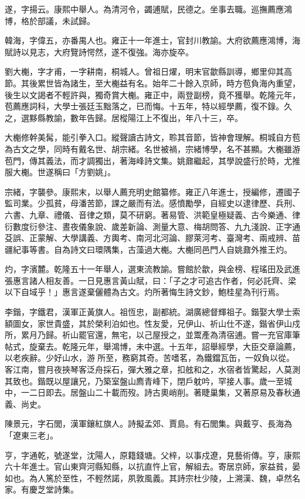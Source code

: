 \begin{pinyinscope}
遂，字揚云。康熙中舉人。為清河令，蠲逋賦，民德之。坐事去職。巡撫薦應鴻博，格於部議，未試歸。

韓海，字偉五，亦番禺人也。雍正十一年進士，官封川教諭。大府欲薦應鴻博，海賦詩以見志，大府覽詩愕然，遂不復強。海亦旋卒。

劉大櫆，字才甫，一字耕南，桐城人。曾祖日燿，明末官歙縣訓導，鄉里仰其高節。其後累世皆為諸生，至大櫆益有名。始年二十餘入京師，時方苞負海內重望，後生以文謁者不輕許與，獨奇賞大櫆。雍正中，兩登副榜，竟不獲舉。乾隆元年，苞薦應詞科，大學士張廷玉黜落之，已而悔。十五年，特以經學薦，復不錄。久之，選黟縣教諭，數年告歸。居樅陽江上不復出，年八十三，卒。

大櫆修幹美髯，能引拳入口。縱聲讀古詩文，聆其音節，皆神會理解。桐城自方苞為古文之學，同時有戴名世、胡宗緒。名世被禍，宗緒博學，名不甚顯。大櫆雖游苞門，傳其義法，而才調獨出，著海峰詩文集。姚鼐繼起，其學說盛行於時，尤推服大櫆。世遂稱曰「方劉姚」。

宗緒，字襲參。康熙末，以舉人薦充明史館纂修。雍正八年進士，授編修，遷國子監司業。少孤貧，母潘苦節，課之嚴而有法。感憤勵學，自經史以逮律歷、兵刑、六書、九章、禮儀、音律之類，莫不研窮。著易管、洪範皇極疑義、古今樂通、律衍數度衍參注、晝夜儀象說、歲差新論、測量大意、梅胡問答、九九淺說、正字通芟誤、正蒙解、大學講義、方輿考、南河北河論、膠萊河考、臺灣考、兩戒辨、苗疆紀事等書。自為詩文曰環隅集，古藻過大櫆。大櫆同邑門人自姚鼐外推王灼。

灼，字濱麓。乾隆五十一年舉人，選東流教諭。嘗館於歙，與金榜、程瑤田及武進張惠言諸人相友善。一日見惠言黃山賦，曰：「子之才可追古作者，何必託齊、梁以下自域乎！」惠言遂棄儷體為古文。灼所著悔生詩文鈔，鮑桂星為刊行焉。

李鍇，字鐵君，漢軍正黃旗人。祖恆忠，副都統。湖廣總督輝祖子。鍇娶大學士索額圖女，家世貴盛，其於榮利泊如也。性友愛，兄伊山、祈山仕不遂，鍇省伊山戍所，累月乃歸。祈山罷官還，無宅，以己屋授之，並鬻產為清宿逋。嘗一充官庫筆帖式，旋棄去。乾隆元年，舉鴻博，未中選。十五年，詔舉經學，大臣交章論薦，以老疾辭。少好山水，游所至，務窮其奇。苦嗜茗，為鐵鐺瓦缶，一奴負以從。客江南，嘗月夜挾琴客泛舟採石，彈大雅之章，扣舷和之，水宿者皆驚起，人莫測其致也。鍇既以屋讓兄，乃築室盤山廌青峰下，閉戶躭吟，罕接人事。歲一至城中，一二日即去。居盤山二十載而歿。詩古奧峭削。著睫巢集，又著原易及春秋通義、尚史。

陳景元，字石閭，漢軍鑲紅旗人。詩擬孟郊、賈島。有石閭集。與戴亨、長海為「遼東三老」。

亨，字通乾，號遂堂，沈陽人，原籍錢塘。父梓，以事戍遼，見藝術傳。亨，康熙六十年進士。官山東齊河縣知縣，以抗直忤上官，解組去。寄居京師，家益貧，晏如也。為人篤於至性，不輕然諾，夙敦風義。其詩宗杜少陵，上溯漢、魏，卓然名家。有慶芝堂詩集。


\end{pinyinscope}
